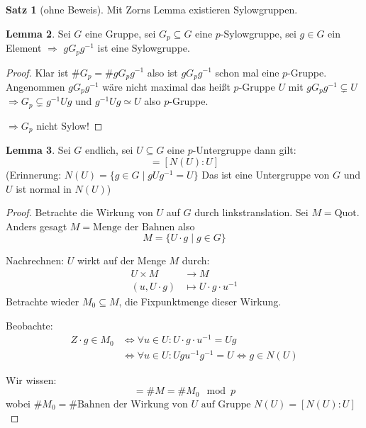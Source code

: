 \documentclass[12pt,parskip=full]{scrartcl}
\theoremstyle{definition}
\newtheorem{theorem}{Satz}[section]
\newtheorem{lemma}[theorem]{Lemma}
\theoremstyle{remark}
\begin{document}
	\begin{theorem}[ohne Beweis]
		Mit Zorns Lemma existieren Sylowgruppen.
	\end{theorem}

	\begin{lemma}
		Sei $G$ eine Gruppe, sei $G_p \subseteq G$ eine $p$-Sylowgruppe, sei $g \in G$ ein Element $\Rightarrow$ $g G_p g^{-1}$ ist eine Sylowgruppe.
	\end{lemma}

	\begin{proof}
		Klar ist $\#G_p = \# g G_p g^{-1}$ also ist $g G_p g^{-1}$ schon mal eine $p$-Gruppe.
		Angenommen $g G_p g^{-1}$ wäre nicht maximal das heißt $p$-Gruppe $U$ mit $g G_p g^{-1} \subsetneq U$ $\Rightarrow G_p \subsetneq g^{-1} U g$ und $g^{-1} U g \simeq U$ also $p$-Gruppe.
		
		$\Rightarrow G_p$ nicht Sylow!
	\end{proof}

	\begin{lemma}
		Sei $G$ endlich, sei $U \subseteq G$ eine $p$-Untergruppe dann gilt:
		\begin{equation*}
			[G:U] = [N(U): U]
		\end{equation*}
		(Erinnerung: $N(U) = \{ g \in G \mid g U g^{-1} = U \}$ Das ist eine Untergruppe von $G$ und $U$ ist normal in $N(U)$)
	\end{lemma}
	
	\begin{proof}
		Betrachte die Wirkung von $U$ auf $G$ durch linkstranslation. Sei $M = \text{Quot}$. Anders gesagt $M = \text{Menge der Bahnen}$ also
		\begin{equation*}
			M = \{ U \cdot g \mid g \in G \}
		\end{equation*}
		
		Nachrechnen: $U$ wirkt auf der Menge $M$ durch:
		\begin{align*}
			U \times M &\longrightarrow M \\
			(u, U \cdot g) &\longmapsto U \cdot g \cdot u^{-1}
		\end{align*}
		Betrachte wieder $M_0 \subseteq M$, die Fixpunktmenge dieser Wirkung.
		
		Beobachte: 
		\begin{align*}
			Z \cdot g \in M_0 &\Leftrightarrow \forall u \in U: U \cdot g \cdot u^{-1} = U g \\
			&\Leftrightarrow \forall u \in U: U g u^{-1} g^{-1} = U \Leftrightarrow g \in N(U)
		\end{align*}
		
		Wir wissen:
		\begin{equation*}
			[G:U] = \#M = \# M_0 \mod p
		\end{equation*}
		wobei $\#M_0 = \#\text{Bahnen der Wirkung von $U$ auf Gruppe $N(U)$} = [N(U):U]$
	\end{proof}
\end{document}
